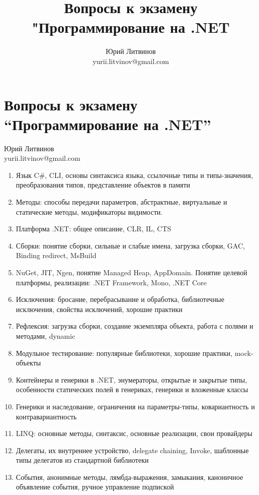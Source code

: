 \documentclass[a5paper]{article}
\title{Вопросы к экзамену "Программирование на .NET}
\author{Юрий Литвинов\\\small{yurii.litvinov@gmail.com}}
\begin{document}
\thispagestyle{empty}

\section*{Вопросы к экзамену ``Программирование на .NET''}

\begin{flushright}\begin{small}Юрий Литвинов\\\small{yurii.litvinov@gmail.com}\end{small}\end{flushright}

\begin{enumerate}
	\item Язык C\#, CLI, основы синтаксиса языка, ссылочные типы и типы-значения, преобразования типов, представление объектов в памяти
	\item Методы: способы передачи параметров, абстрактные, виртуальные и статические методы, модификаторы видимости.
	\item Платформа .NET: общее описание, CLR, IL, CTS
	\item Сборки: понятие сборки, сильные и слабые имена, загрузка сборки, GAC, Binding redirect, MsBuild
	\item NuGet, JIT, Ngen, понятие Managed Heap, AppDomain. Понятие целевой платформы, реализации: .NET Framework, Mono, .NET Core
	\item Исключения: бросание, перебрасывание и обработка, библиотечные исключения, свойства исключений, хорошие практики
	\item Рефлексия: загрузка сборки, создание экземпляра объекта, работа с полями и методами, dynamic
	\item Модульное тестирование: популярные библиотеки, хорошие практики, mock-объекты
	\item Контейнеры и генерики в .NET, энумераторы, открытые и закрытые типы, особенности статических полей в генериках, генерики и вложенные классы
	\item Генерики и наследование, ограничения на параметры-типы, ковариантность и контравариантность
	\item LINQ: основные методы, синтаксис, основные реализации, свои провайдеры
	\item Делегаты, их внутреннее устройство, delegate chaining, Invoke, шаблонные типы делегатов из стандартной библиотеки
	\item События, анонимные методы, лямбда-выражения, замыкания, каноничное объявление события, ручное управление подпиской

\end{enumerate}
\end{document}
